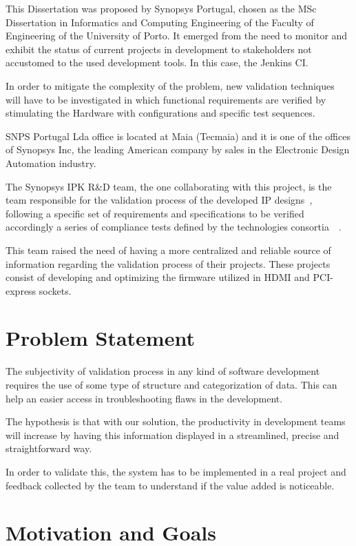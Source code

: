 This Dissertation was proposed by Synopsys Portugal, chosen as the MSc Dissertation in Informatics and Computing Engineering of the Faculty of Engineering of the University of Porto.
It emerged from the need to monitor and exhibit the status of current projects in development to stakeholders not accustomed to the used development tools. In this case, the Jenkins CI.

In order to mitigate the complexity of the problem, new validation techniques will have to be investigated in which functional requirements are verified by stimulating the Hardware with configurations and specific test sequences.

SNPS Portugal Lda office is located at Maia (Tecmaia) and it is one of the offices of Synopsys Inc, the leading American company by sales in the Electronic Design Automation industry. 

The Synopsys IPK R\&D team, the one collaborating with this project, is the team responsible for the validation process of the developed IP designs~\cite{snps:ipInitiative}, following a specific set of requirements and specifications to be verified accordingly a series of compliance tests defined by the technologies consortia~\cite{snps:hdmiConsortium}~\cite{snps:pciConsortium}.

This team raised the need of having a more centralized and reliable source of information regarding the validation process  of their projects. These projects consist of developing and optimizing the firmware utilized in HDMI and PCI-express sockets. 

\section{Problem Statement}

The subjectivity of validation process in any kind of software development requires the use of some type of structure and categorization of data. This can help an easier access in troubleshooting flaws in the development.

The hypothesis is that with our solution, the productivity in development teams will increase by having this information displayed in a streamlined, precise and straightforward way.

In order to validate this, the system has to be implemented in a real project and feedback collected by the team to understand if the value added is noticeable.


\section{Motivation and Goals} \label{sec:goals}

